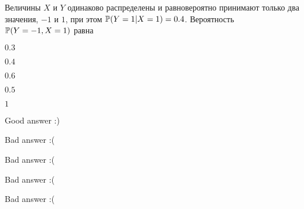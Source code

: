 
\begin{question}
Величины \(X\) и \(Y\) одинаково распределены и равновероятно принимают
только два значения, \(-1\) и \(1\), при этом \(\P(Y=1|X=1)=0.4\).
Вероятность \(\P(Y=-1,X=1)\) равна
\begin{answerlist}
  \item \(0.3\)
  \item \(0.4\)
  \item \(0.6\)
  \item \(0.5\)
  \item \(1\)
\end{answerlist}
\end{question}

\begin{solution}
\begin{answerlist}
  \item Good answer :)
  \item Bad answer :(
  \item Bad answer :(
  \item Bad answer :(
  \item Bad answer :(
\end{answerlist}
\end{solution}

